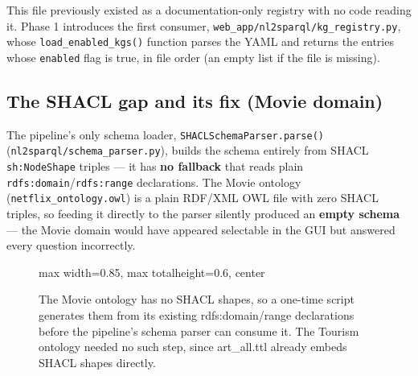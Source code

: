 \documentclass[11pt,a4paper]{article}
\newcommand{\code}[1]{\texttt{#1}}
\begin{document}
This file previously existed as a documentation-only registry with no code reading it. Phase 1
introduces the first consumer, \code{web\_app/nl2sparql/kg\_registry.py}, whose
\code{load\_enabled\_kgs()} function parses the YAML and returns the entries whose
\code{enabled} flag is true, in file order (an empty list if the file is missing).

\subsection{The SHACL gap and its fix (Movie domain)}
\label{sec:shacl-fix}

The pipeline's only schema loader, \code{SHACLSchemaParser.parse()}
(\code{nl2sparql/schema\_parser.py}), builds the schema entirely from SHACL \code{sh:NodeShape}
triples --- it has \textbf{no fallback} that reads plain \code{rdfs:domain}\slash\code{rdfs:range}
declarations. The Movie ontology (\code{netflix\_ontology.owl}) is a plain RDF/XML OWL file with
zero SHACL triples, so feeding it directly to the parser silently produced an \textbf{empty
schema} --- the Movie domain would have appeared selectable in the GUI but answered every
question incorrectly.

\begin{figure}[H]
\centering
\begin{adjustbox}{max width=0.85\textwidth, max totalheight=0.6\textheight, center}
\end{adjustbox}
\caption{The Movie ontology has no SHACL shapes, so a one-time script generates them from its
existing rdfs:domain/range declarations before the pipeline's schema parser can consume it. The
Tourism ontology needed no such step, since art\_all.ttl already embeds SHACL shapes directly.}
\label{fig:shacl-fix}
\end{figure}
\end{document}
